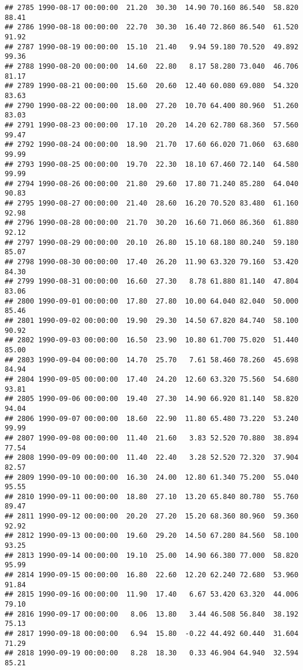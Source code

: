 \documentclass{article}\usepackage{graphicx, color}
\makeatletter
\newenvironment{kframe}{%
 \def\at@end@of@kframe{}%
 \ifinner\ifhmode%
  \def\at@end@of@kframe{\end{minipage}}%
  \begin{minipage}{\columnwidth}%
 \fi\fi%
 \def\FrameCommand##1{\hskip\@totalleftmargin \hskip-\fboxsep
 \colorbox{shadecolor}{##1}\hskip-\fboxsep
     \hskip-\linewidth \hskip-\@totalleftmargin \hskip\columnwidth}%
 \MakeFramed {\advance\hsize-\width
   \@totalleftmargin\z@ \linewidth\hsize
   \@setminipage}}%
 {\par\unskip\endMakeFramed%
 \at@end@of@kframe}
\newenvironment{knitrout}{}{} %
\makeatother
\begin{document}
\begin{knitrout}
\begin{kframe}
\begin{verbatim}
## 2785 1990-08-17 00:00:00  21.20  30.30  14.90 70.160 86.540  58.820  88.41
## 2786 1990-08-18 00:00:00  22.70  30.30  16.40 72.860 86.540  61.520  91.92
## 2787 1990-08-19 00:00:00  15.10  21.40   9.94 59.180 70.520  49.892  99.36
## 2788 1990-08-20 00:00:00  14.60  22.80   8.17 58.280 73.040  46.706  81.17
## 2789 1990-08-21 00:00:00  15.60  20.60  12.40 60.080 69.080  54.320  83.63
## 2790 1990-08-22 00:00:00  18.00  27.20  10.70 64.400 80.960  51.260  83.03
## 2791 1990-08-23 00:00:00  17.10  20.20  14.20 62.780 68.360  57.560  99.47
## 2792 1990-08-24 00:00:00  18.90  21.70  17.60 66.020 71.060  63.680  99.99
## 2793 1990-08-25 00:00:00  19.70  22.30  18.10 67.460 72.140  64.580  99.99
## 2794 1990-08-26 00:00:00  21.80  29.60  17.80 71.240 85.280  64.040  90.83
## 2795 1990-08-27 00:00:00  21.40  28.60  16.20 70.520 83.480  61.160  92.98
## 2796 1990-08-28 00:00:00  21.70  30.20  16.60 71.060 86.360  61.880  92.12
## 2797 1990-08-29 00:00:00  20.10  26.80  15.10 68.180 80.240  59.180  85.07
## 2798 1990-08-30 00:00:00  17.40  26.20  11.90 63.320 79.160  53.420  84.30
## 2799 1990-08-31 00:00:00  16.60  27.30   8.78 61.880 81.140  47.804  83.06
## 2800 1990-09-01 00:00:00  17.80  27.80  10.00 64.040 82.040  50.000  85.46
## 2801 1990-09-02 00:00:00  19.90  29.30  14.50 67.820 84.740  58.100  90.92
## 2802 1990-09-03 00:00:00  16.50  23.90  10.80 61.700 75.020  51.440  85.00
## 2803 1990-09-04 00:00:00  14.70  25.70   7.61 58.460 78.260  45.698  84.94
## 2804 1990-09-05 00:00:00  17.40  24.20  12.60 63.320 75.560  54.680  93.81
## 2805 1990-09-06 00:00:00  19.40  27.30  14.90 66.920 81.140  58.820  94.04
## 2806 1990-09-07 00:00:00  18.60  22.90  11.80 65.480 73.220  53.240  99.99
## 2807 1990-09-08 00:00:00  11.40  21.60   3.83 52.520 70.880  38.894  77.54
## 2808 1990-09-09 00:00:00  11.40  22.40   3.28 52.520 72.320  37.904  82.57
## 2809 1990-09-10 00:00:00  16.30  24.00  12.80 61.340 75.200  55.040  95.55
## 2810 1990-09-11 00:00:00  18.80  27.10  13.20 65.840 80.780  55.760  89.47
## 2811 1990-09-12 00:00:00  20.20  27.20  15.20 68.360 80.960  59.360  92.92
## 2812 1990-09-13 00:00:00  19.60  29.20  14.50 67.280 84.560  58.100  93.25
## 2813 1990-09-14 00:00:00  19.10  25.00  14.90 66.380 77.000  58.820  95.99
## 2814 1990-09-15 00:00:00  16.80  22.60  12.20 62.240 72.680  53.960  91.84
## 2815 1990-09-16 00:00:00  11.90  17.40   6.67 53.420 63.320  44.006  79.10
## 2816 1990-09-17 00:00:00   8.06  13.80   3.44 46.508 56.840  38.192  75.13
## 2817 1990-09-18 00:00:00   6.94  15.80  -0.22 44.492 60.440  31.604  71.29
## 2818 1990-09-19 00:00:00   8.28  18.30   0.33 46.904 64.940  32.594  85.21

\end{verbatim}
\end{kframe}
\end{knitrout}
\end{document}
